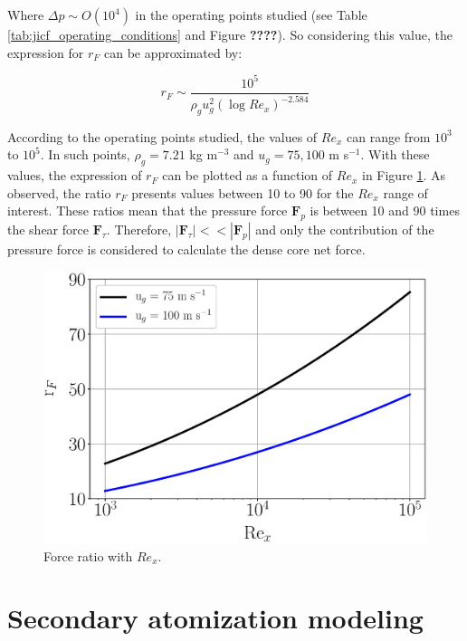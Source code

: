 Where $\Delta p \sim O \left( 10^4 \right) $ in the operating points studied (see Table \ref{tab:jicf_operating_conditions} and Figure \textbf{????}). So considering this value, the expression for $r_F$ can be approximated by:

\begin{equation}
r_F \sim \frac{10^5}{\rho_g u_g^2 \left( \log Re_x \right)^{-2.584}}
\end{equation}

According to the operating points studied, the values of $Re_x$ can range from $10^3$ to $10^5$. In such points, $\rho_g = 7.21$ kg m$^{-3}$ and $u_g = 75, 100$ m s$^{-1}$. With these values, the expression of $r_F$ can be plotted as a function of $Re_x$ in Figure \ref{fig:ALM_rF_vs_Rex}. As observed, the ratio $r_F$ presents values between 10 to 90 for the $Re_x$ range of interest. These ratios mean that the pressure force $\boldsymbol{F}_p$ is between 10 and 90 times the shear force $\boldsymbol{F}_\tau$. Therefore, $|\boldsymbol{F}_\tau| << |\boldsymbol{F}_p|$ and only the contribution of the pressure force is considered to calculate the dense core net force.




\begin{figure}[h!]
	\centering
	\includegraphics[scale=0.5]{./part2_developments/figures_ch4_SLI/ALM_rF_vs_Rex.eps}
	\caption{Force ratio with $Re_x$.}
	\label{fig:ALM_rF_vs_Rex}
\end{figure}



\section{Secondary atomization modeling}
\label{sec:ch4_secondary_atomization_modeling}

